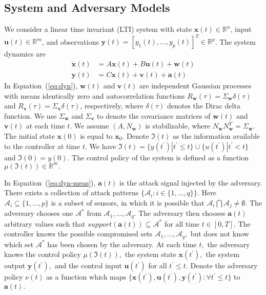 \documentclass[journal]{IEEEtran}
\begin{document}
\subsection{System and Adversary Models}
We consider a linear time invariant (LTI) system with state $\mathbf{x}(t) \in \mathbb{R}^{n}$, input $\mathbf{u}(t) \in \mathbb{R}^{m}$, and observations $\mathbf{y}(t) = \left[y_1(t),\ldots,y_p(t)\right]^T \in \mathbb{R}^{p}$. The system dynamics are 
\begin{subequations}
\label{eq:dyn}
    \begin{align}
        \label{eq:dyn-state}
        \dot{\mathbf{x}}(t) &= A\mathbf{x}(t) + B\mathbf{u}(t) + \mathbf{w}(t) \\
        \label{eq:dyn-meas}
        \mathbf{y}(t) &= C\mathbf{x}(t) + \mathbf{v}(t) + \mathbf{a}(t)
    \end{align}
\end{subequations}
In Equation~(\ref{eq:dyn}), $\mathbf{w}(t)$ and $\mathbf{v}(t)$ are independent Gaussian processes with means identically zero and autocorrelation functions $R_{\mathbf{w}}(\tau) = \Sigma_{\mathbf{w}}\delta(\tau)$ and $R_{\mathbf{v}}(\tau) = \Sigma_{\mathbf{v}}\delta(\tau)$, respectively, where $\delta(\tau)$ denotes the Dirac delta function. 
We use $\Sigma_{\mathbf{w}}$ and $\Sigma_{\mathbf{v}}$ to denote the covariance matrices of $\mathbf{w}(t)$ and $\mathbf{v}(t)$ at each time $t$. We assume $(A, N_{\mathbf{w}})$ is stabilizable, where $N_{\mathbf{w}}N_{\mathbf{w}}^T = \Sigma_{\mathbf{w}}.$
The initial state $\mathbf{x}(0)$ is equal to $\mathbf{x}_{0}$.
Denote $\mathfrak{I}(t)$ as the information available to the controller at time $t$. We have $\mathfrak{I}(t) = \{y(t^\prime)|t^\prime\leq t\}\cup\{u(t^\prime)|t^\prime<t\}$ and $\mathfrak{I}(0) = y(0).$ The control policy of the system is defined as a function $\mu(\mathfrak{I}(t)) \in \mathbb{R}^{m}.$

In Equation~(\ref{eq:dyn-meas}), $\mathbf{a}(t)$ is the attack signal injected by the adversary. 
There exists a collection of attack patterns $\{\mathcal{A}_i: i \in \{1,\ldots,q\}\}.$ Here $\mathcal{A}_i \subseteq \{1,\ldots,p\}$ is a subset of sensors, in which it is possible that $\mathcal{A}_i \bigcap \mathcal{A}_j \neq \emptyset$. 
The adversary chooses one $\mathcal{A}^{\ast}$ from $\mathcal{A}_1,\ldots,\mathcal{A}_q.$ The adversary then chooses $\mathbf{a}(t)$ arbitrary values such that $support(\mathbf{a}(t)) \subseteq \mathcal{A}^{\ast}$ for all time $t \in [0,T].$ The controller knows the possible compromised sets $\mathcal{A}_1,\ldots,\mathcal{A}_q,$ but does not know which set $\mathcal{A}^{\ast}$ has been chosen by the adversary.
At each time $t,$ the adversary knows the control policy $\mu(\mathfrak{I}(t)),$ the system state $\mathbf{x}(t^{\prime}),$ the system output $\mathbf{y}(t^{\prime}),$ and the control input $\mathbf{u}(t^{\prime})$ for all $t^{\prime} \leq t.$ Denote the adversary policy $\nu(t)$ as a function which maps 
$\{\mathbf{x}(t^{\prime}), \mathbf{u}(t^{\prime}), \mathbf{y}(t^{\prime}): \forall t^{\prime} \leq t\}$ to $\mathbf{a}(t).$
\end{document}
